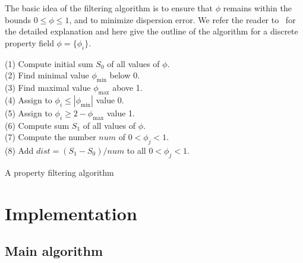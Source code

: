 The basic idea of the filtering algorithm is to ensure that $\phi$
remains within the bounds $0 \leq \phi \leq 1$, and to minimize
dispersion error.  We refer the reader to~\citet{LenardicKaula1993}
for the detailed explanation and here give the outline of the algorithm
for a discrete property field $\phi = \{\phi_i \}$.
\begin{algorithm}
  \begin{tabbing}
  (1) Compute initial sum $S_0$ of all values of $\phi$. \\
  (2) Find minimal value $\phi_{\min}$ below 0. \\
  (3) Find maximal value $\phi_{\max}$ above 1. \\
  (4) Assign to $\phi_i \leqslant | \phi_{\min} |$ value 0. \\
  (5) Assign to $\phi_i \geqslant 2 - \phi_{\max} $ value 1. \\
  (6) Compute sum $S_1$ of all values of $\phi$. \\
  (7) Compute the number $num$ of $0 < \phi_j < 1$. \\
  (8) Add $dist = (S_1 - S_0)/num$ to all $ 0 < \phi_j < 1$.
  \end{tabbing}
  \caption{A property filtering algorithm}
  \label{vynnytska:alg:filtering}
\end{algorithm}


\section{Implementation}

\subsection{Main algorithm}

